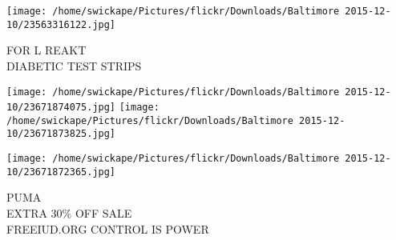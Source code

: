 \documentclass[10pt,letterpaper]{article}
\begin{document}
\vspace{0.25in}
\texttt{[image: /home/swickape/Pictures/flickr/Downloads/Baltimore 2015-12-10/23563316122.jpg]}

FOR L REAKT\\
DIABETIC TEST STRIPS\\
\pagebreak

\texttt{[image: /home/swickape/Pictures/flickr/Downloads/Baltimore 2015-12-10/23671874075.jpg]}
\texttt{[image: /home/swickape/Pictures/flickr/Downloads/Baltimore 2015-12-10/23671873825.jpg]}

\texttt{[image: /home/swickape/Pictures/flickr/Downloads/Baltimore 2015-12-10/23671872365.jpg]}

PUMA\\
EXTRA 30\% OFF SALE\\
FREEIUD.ORG CONTROL IS POWER\\
\pagebreak
\end{document}
